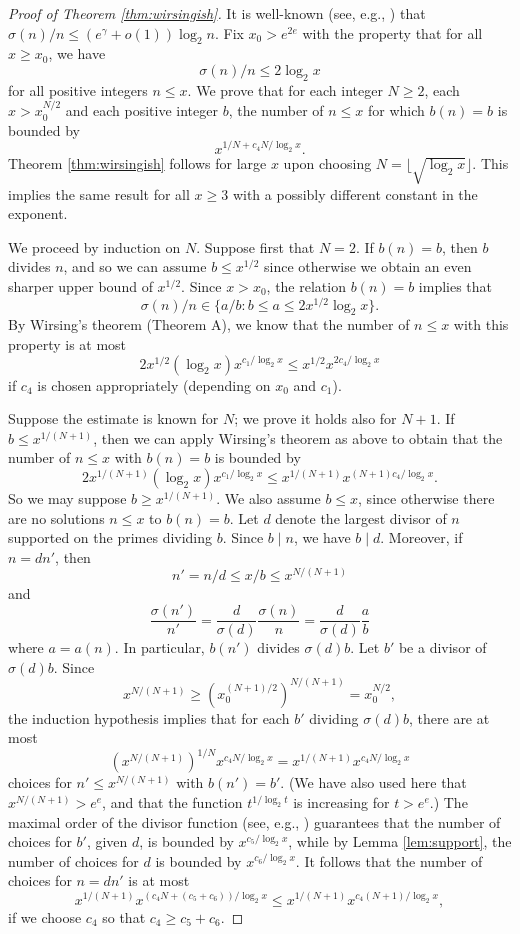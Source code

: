 \documentclass[12pt]{amsart}
\theoremstyle{definition}
\theoremstyle{remark}
\begin{document}
\begin{proof}[Proof of Theorem \ref{thm:wirsingish}] It is well-known (see, e.g., \cite[Theorem 323]{HW79}) that $\sigma(n)/n \leq (e^{\gamma}+o(1))\log_2{n}$. Fix $x_0 > e^{2e}$ with the property that for all $x \geq x_0$, we have \[ \sigma(n)/n \leq 2\log_2{x} \]
for all positive integers $n \leq x$.  We prove that for each integer $N \geq 2$, each $x > x_0^{N/2}$ and each positive integer $b$, the number of $n \leq x$ for which $b(n) = b$ is bounded by
\[ x^{1/N + c_4 N/\log_2{x}}. \]
Theorem \ref{thm:wirsingish} follows for large $x$ upon choosing $N = \lfloor \sqrt{\log_2{x}}\rfloor$. This implies the same result for all $x\geq 3$ with a possibly different constant in the exponent.

We proceed by induction on $N$. Suppose first that $N=2$. If $b(n)=b$, then $b$ divides $n$, and so we can assume $b \leq x^{1/2}$ since otherwise we obtain an even sharper upper bound of $x^{1/2}$. Since $x  > x_0$, the relation $b(n)=b$ implies that \[ \sigma(n)/n \in \{a/b: b \leq a \leq 2x^{1/2} \log_2{x}\}.\] By Wirsing's theorem (Theorem A), we know that the number of $n \leq x$ with this property is at most
\[ 2x^{1/2}(\log_2{x}) x^{c_1/\log_2{x}} \leq x^{1/2} x^{2c_4/\log_2{x}} \]
if $c_4$ is chosen appropriately (depending on $x_0$ and $c_1$).

Suppose the estimate is known for $N$; we prove it holds also for $N+1$. If $b \leq x^{1/(N+1)}$, then we can apply Wirsing's theorem as above to obtain that the number of $n\leq x$ with $b(n)=b$ is bounded by
\[ 2x^{1/(N+1)}(\log_2{x}) x^{c_1/\log_2{x}} \leq x^{1/(N+1)} x^{(N+1)c_4/\log_2{x}}. \]
So we may suppose $b \geq x^{1/(N+1)}$. We also assume $b \leq x$, since otherwise there are no solutions $n\leq x$ to $b(n)=b$. Let $d$ denote the largest divisor of $n$ supported on the primes dividing $b$. Since $b\mid n$, we have $b \mid d$. Moreover, if $n = d n'$, then \[ n' = n/d \leq x/b \leq  x^{N/(N+1)}\] and
\[ \frac{\sigma(n')}{n'} = \frac{d}{\sigma(d)}\frac{\sigma(n)}{n} = \frac{d}{\sigma(d)} \frac{a}{b} \]
where $a= a(n)$. In  particular, $b(n')$ divides $\sigma(d) b$. Let $b'$ be a divisor of $ \sigma(d) b$. Since \[ x^{N/(N+1)} \geq (x_0^{(N+1)/2})^{N/(N+1)} = x_0^{N/2}, \] the induction hypothesis implies that for each $b'$ dividing $\sigma(d) b$, there are at most
\[ (x^{N/(N+1)})^{1/N} x^{c_4 N/\log_2{x}} = x^{1/(N+1)} x^{c_4 N/\log_2{x}}\]
choices for $n'\leq x^{N/(N+1)}$ with $b(n')=b'$. (We have also used here that $x^{N/(N+1)} > e^e$, and that the function $t^{1/\log_2{t}}$ is increasing for $t > e^e$.) The maximal order of the divisor function (see, e.g., \cite[Theorem 317]{HW79}) guarantees that the number of choices for $b'$, given $d$, is bounded by $x^{c_5/\log_2{x}}$, while by Lemma \ref{lem:support}, the number of choices for $d$ is bounded by $x^{c_6/\log_2{x}}$. It follows that the number of choices for $n = dn'$ is at most
\[ x^{1/(N+1)}x^{(c_4 N + (c_5+c_6))/\log_2{x}} \leq x^{1/(N+1)} x^{c_4 (N+1)/\log_2{x}},\]
if we choose $c_4$ so that $c_4 \geq c_5 + c_6$.
\end{proof}
\end{document}
